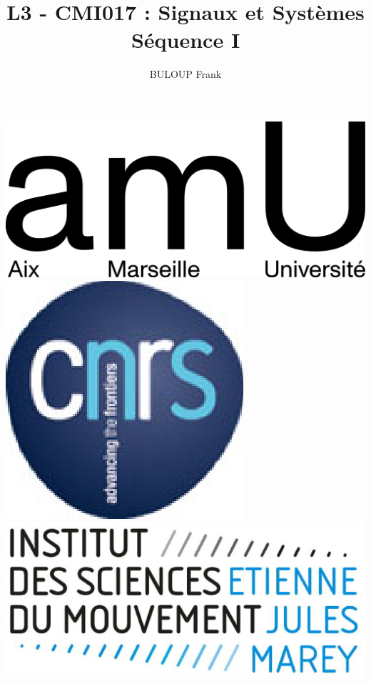 \documentclass[a4paper,11pt]{beamer}
\title{L3 - CMI017 : Signaux et Systèmes\\Séquence I}
\author{BULOUP Frank}
\institute{Aix Marseille Université\\Institut des Sciences du Mouvement}
\date{}
\begin{document}
\begin{frame}[plain]  
	\titlepage 
	\vspace{1cm}
	
	\includegraphics[scale=0.6]{images/LogoAMU.png}\hspace*{2cm}
	\includegraphics[scale=0.2]{images/LogoCNRS.eps}\hspace*{2cm}
	\includegraphics[scale=0.1]{images/LogoISM.eps}
\end{frame} 
 
\end{document}
